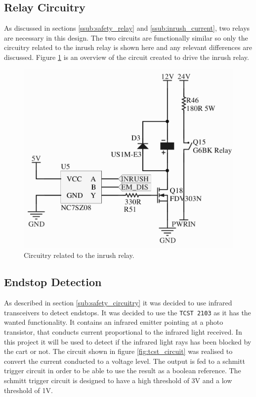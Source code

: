 \subsection{Relay Circuitry} %
\label{sub:relay_circuitry}
As discussed in sections \ref{ssub:safety_relay} and \ref{ssub:inrush_current}, two relays are necessary in this design.
The two circuits are functionally similar so only the circuitry related to the inrush relay is shown here and any relevant differences are discussed.
Figure \ref{fig:relaycircuit} is an overview of the circuit created to drive the inrush relay.

\begin{figure}
	\centering
	\includegraphics[width=\linewidth]{graphics/relay_circuit}
	\caption{Circuitry related to the inrush relay.}
	\label{fig:relaycircuit}
\end{figure}


\subsection{Endstop Detection} %
\label{sub:endstop_detection}
As described in section \ref{sub:safety_circuitry} it was decided to use infrared transceivers to detect endstops.
It was decided to use the \texttt{TCST 2103} as it has the wanted functionality.
It contains an infrared emitter pointing at a photo transistor, that conducts current proportional to the infrared light received.
In this project it will be used to detect if the infrared light rays has been blocked by the cart or not. 
The circuit shown in figure \ref{fig:tcst_circuit} was realised to convert the current conducted to a voltage level. 
The output is fed to a schmitt trigger circuit in order to be able to use the result as a boolean reference.
The schmitt trigger circuit is designed to have a high threshold of 3V and a low threshold of 1V. 

